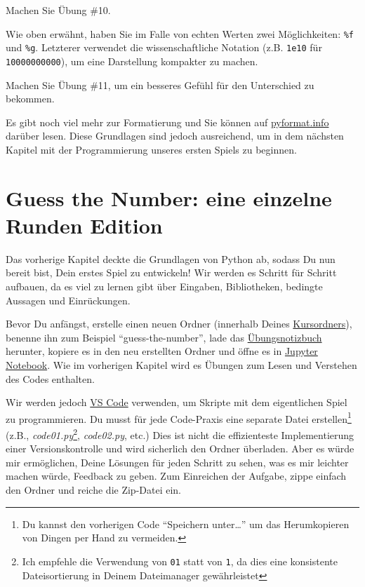\documentclass[
]{book}
\begin{document}
Machen Sie Übung \#10.

Wie oben erwähnt, haben Sie im Falle von echten Werten zwei Möglichkeiten: \texttt{\%f} und \texttt{\%g}. Letzterer verwendet die wissenschaftliche Notation (z.B. \texttt{1e10} für \texttt{10000000000}), um eine Darstellung kompakter zu machen.

Machen Sie Übung \#11, um ein besseres Gefühl für den Unterschied zu bekommen.

Es gibt noch viel mehr zur Formatierung und Sie können auf \href{https://pyformat.info/}{pyformat.info} darüber lesen. Diese Grundlagen sind jedoch ausreichend, um in dem nächsten Kapitel mit der Programmierung unseres ersten Spiels zu beginnen.

\hypertarget{guess-the-number-single-round}{%
\chapter{Guess the Number: eine einzelne Runden Edition}\label{guess-the-number-single-round}}

Das vorherige Kapitel deckte die Grundlagen von Python ab, sodass Du nun bereit bist, Dein erstes Spiel zu entwickeln! Wir werden es Schritt für Schritt aufbauen, da es viel zu lernen gibt über Eingaben, Bibliotheken, bedingte Aussagen und Einrückungen.

Bevor Du anfängst, erstelle einen neuen Ordner (innerhalb Deines \protect\hyperlink{files-folder}{Kursordners}), benenne ihn zum Beispiel ``guess-the-number'', lade das \href{notebooks/Guess\%20the\%20number\%20-\%20single\%20round.ipynb}{Übungsnotizbuch} herunter, kopiere es in den neu erstellten Ordner und öffne es in \protect\hyperlink{jupyter-notebooks}{Jupyter Notebook}. Wie im vorherigen Kapitel wird es Übungen zum Lesen und Verstehen des Codes enthalten.

Wir werden jedoch \protect\hyperlink{install-vs-code}{VS Code} verwenden, um Skripte mit dem eigentlichen Spiel zu programmieren. Du musst für jede Code-Praxis eine separate Datei erstellen\footnote{Du kannst den vorherigen Code ``Speichern unter\ldots{}'' um das Herumkopieren von Dingen per Hand zu vermeiden.} (z.B., \emph{code01.py}\footnote{Ich empfehle die Verwendung von \texttt{01} statt von \texttt{1}, da dies eine konsistente Dateisortierung in Deinem Dateimanager gewährleistet}, \emph{code02.py}, etc.) Dies ist nicht die effizienteste Implementierung einer Versionskontrolle und wird sicherlich den Ordner überladen. Aber es würde mir ermöglichen, Deine Lösungen für jeden Schritt zu sehen, was es mir leichter machen würde, Feedback zu geben. Zum Einreichen der Aufgabe, zippe einfach den Ordner und reiche die Zip-Datei ein.
\end{document}
